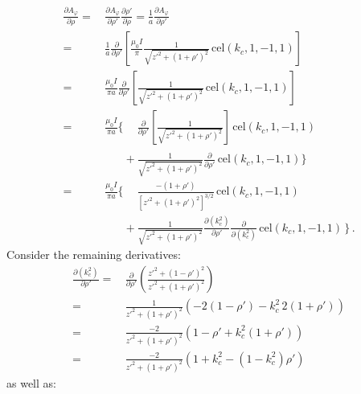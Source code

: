 \begin{align}
      \frac{\partial A_\varphi}{\partial \rho}
 =&\, \frac{\partial A_\varphi}{\partial \rho'} \frac{\partial \rho'}{\partial \rho}
 =    \frac{1}{a} \frac{\partial A_\varphi}{\partial \rho'} \nonumber \\
 =&\, \frac{1}{a} \frac{\partial}{\partial \rho'} \left[
                               \frac{\mu_0 I}{\pi}
                               \frac{1}{\sqrt{z'^2 + (1 + \rho')^2}}
                               \,\mathrm{cel}(k_c, 1, -1, 1) \right] \nonumber \\
 =&\, \frac{\mu_0 I}{\pi a} \frac{\partial}{\partial \rho'} \left[
        \frac{1}{\sqrt{z'^2 + (1 + \rho')^2}} \,\mathrm{cel}(k_c, 1, -1, 1) \right] \nonumber \\
 =&\,          \frac{\mu_0 I}{\pi a} \Biggl\{ \phantom{+}
        \frac{\partial}{\partial \rho'} \left[ \frac{1}{\sqrt{z'^2 + (1 + \rho')^2}} \right] \,\mathrm{cel}(k_c, 1, -1, 1) \nonumber \\
 ~&\, \phantom{\frac{\mu_0 I}{\pi a} \Biggl\{}         +
        \frac{1}{\sqrt{z'^2 + (1 + \rho')^2}} \frac{\partial}{\partial \rho'} \,\mathrm{cel}(k_c, 1, -1, 1) \Biggr\} \nonumber \\
 =&\,          \frac{\mu_0 I}{\pi a} \Biggl\{ \phantom{+}
        \frac{-(1+\rho')}{\left[z'^2 + (1 + \rho')^2\right]^{3/2}}\,\mathrm{cel}(k_c, 1, -1, 1) \nonumber \\
 ~&\, \phantom{\frac{\mu_0 I}{\pi a} \Biggl\{}         +
        \frac{1}{\sqrt{z'^2 + (1 + \rho')^2}} \frac{\partial (k_c^2)}{\partial \rho'}
        \frac{\partial}{\partial (k_c^2)} \,\mathrm{cel}(k_c, 1, -1, 1)\, \Biggr\} \label{eqn:dAphiDrho} \, .
\end{align}
Consider the remaining derivatives:
\begin{align}
      \frac{\partial (k_c^2)}{\partial \rho'}
 =&\, \frac{\partial}{\partial \rho'} \left( \frac{z'^2 + (1 - \rho')^2}{z'^2 + (1 + \rho')^2} \right) \nonumber \\
 =&\, \frac{1}{z'^2 + (1 + \rho')^2} \left(-2(1 - \rho') - k_c^2 \, 2 (1 + \rho') \right) \nonumber \\
 =&\, \frac{-2}{z'^2 + (1 + \rho')^2} \left(1 - \rho' + k_c^2 (1 + \rho') \right) \nonumber \\
 =&\, \frac{-2}{z'^2 + (1 + \rho')^2} \left(1 + k_c^2 - (1 - k_c^2) \rho' \right)
\end{align}
as well as:
